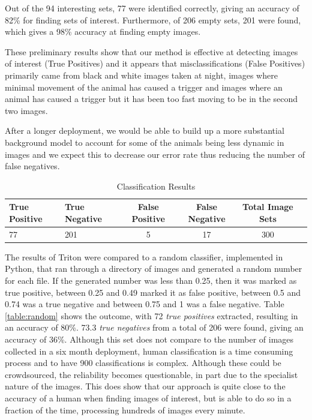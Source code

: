 		Out of the 94 interesting sets, 77 were identified correctly, giving an accuracy of 82\% for finding sets of interest. Furthermore, of 206 empty sets, 201 were found, which gives a 98\% accuracy at finding empty images.
	
		These preliminary results show that our method is effective at detecting images of interest (True Positives) and it appears that misclassifications (False Positives) primarily came from black and white images taken at night, images where minimal movement of the animal has caused a trigger and images where an animal has caused a trigger but it has been too fast moving to be in the second two images.
		
		After a longer deployment, we would be able to build up a more substantial background model to account for some of the animals being less dynamic in images and we expect this to decrease our error rate thus reducing the number of false negatives. 
		
		\begin{footnotesize}
		\begin{table}
		\centering
			\hfill{}
			\begin{tabular}{|l|l|c|c|c|c|}
				\hline
					True Positive & True Negative & False Positive  & False Negative & Total Image Sets \\
				\hline
					77 & 201 & 5 & 17 & 300 \\
				\hline
			\end{tabular}
			\hfill{}
			\caption{Classification Results}
			\label{table:processing}
		\end{table}
		\end{footnotesize}
		
		The results of Triton were compared to a random classifier, implemented in Python, that ran through a directory of images and generated a random number for each file. If the generated number was less than 0.25, then it was marked as true positive, between 0.25 and 0.49 marked it as false positive, between 0.5 and 0.74 was a true negative and between 0.75 and 1 was a false negative. Table \ref{table:random} shows the outcome, with 72 \textit{true positives} extracted, resulting in an accuracy of 80\%. 73.3 \textit{true negatives} from a total of 206 were found, giving an accuracy of 36\%. Although this set does not compare to the number of images collected in a six month deployment, human classification is a time consuming process and to have 900 classifications is complex. Although these could be crowdsourced, the reliability becomes questionable, in part due to the specialist nature of the images. This does show that our approach is quite close to the accuracy of a human when finding images of interest, but is able to do so in a fraction of the time, processing hundreds of images every minute. 
		
